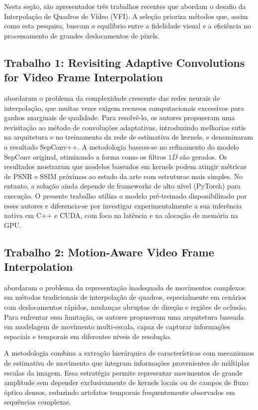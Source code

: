 \documentclass[
    12pt,                %
    openright,           %
    oneside,             %
    a4paper,             %
    english,             %
    brazil               %
]{abntex2}
\begin{document}
Nesta seção, são apresentados três trabalhos recentes que abordam o desafio da Interpolação de Quadros de Vídeo (VFI). A seleção prioriza métodos que, assim como esta pesquisa, buscam o equilíbrio entre a fidelidade visual e a eficiência no processamento de grandes deslocamentos de pixels.

\subsection{Trabalho 1: Revisiting Adaptive Convolutions for Video Frame Interpolation}

 abordaram o problema da complexidade crescente das redes neurais de interpolação, que muitas vezes exigem recursos computacionais excessivos para ganhos marginais de qualidade. Para resolvê-lo, os autores propuseram uma revisitação ao método de convoluções adaptativas, introduzindo melhorias sutis na arquitetura e no treinamento da rede de estimativa de kernels, e denominaram o resultado SepConv++. A metodologia baseou-se no refinamento do modelo SepConv original, otimizando a forma como os filtros $1D$ são gerados. Os resultados mostraram que modelos baseados em kernels podem atingir métricas de PSNR e SSIM próximas ao estado da arte com estruturas mais simples. No entanto, a solução ainda depende de frameworks de alto nível (PyTorch) para execução. O presente trabalho utiliza o modelo pré-treinado disponibilizado por esses autores e diferencia-se por investigar experimentalmente a sua inferência nativa em C++ e CUDA, com foco na latência e na alocação de memória na GPU.

\subsection{Trabalho 2: Motion-Aware Video Frame Interpolation}

 abordaram o problema da representação inadequada de movimentos complexos em métodos tradicionais de interpolação de quadros, especialmente em cenários com deslocamentos rápidos, mudanças abruptas de direção e regiões de oclusão. Para enfrentar essa limitação, os autores propuseram uma arquitetura baseada em modelagem de movimento multi-escala, capaz de capturar informações espaciais e temporais em diferentes níveis de resolução.

A metodologia combina a extração hierárquica de características com mecanismos de estimativa de movimento que integram informações provenientes de múltiplas escalas da imagem. Essa estratégia permite representar movimentos de grande amplitude sem depender exclusivamente de kernels locais ou de campos de fluxo óptico densos, reduzindo artefatos temporais frequentemente observados em sequências complexas.
\end{document}
